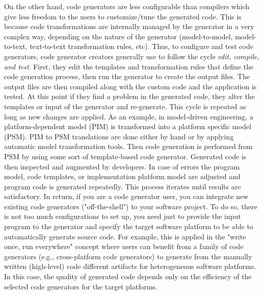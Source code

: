 On the other hand, code generators are less configurable than compilers which give less freedom to the users to customize/tune the generated code. This is because code transformations are internally managed by the generator in a very complex way, depending on the nature of the generator (model-to-model, model-to-text, text-to-text transformation rules, etc).
Thus, to configure and test code generators, code generator creators generally use to follow the cycle \textit{edit, compile, and test}. First, they edit the templates and transformation rules that define the code generation process, then run the generator to create the output files. The output files are then compiled along with the custom code and the application is tested. At this point if they find a problem in the generated code, they alter the templates or input of the generator and re-generate. This cycle is repeated as long as new changes are applied. 
As an example, in model-driven engineering, a platform-dependent model (PIM) is transformed into a platform specific model (PSM). PIM to PSM translations are done either by hand or by applying automatic model transformation tools. Then code generation is performed from PSM by using some sort of template-based code generator. Generated code is then inspected and augmented by developers. In case of errors the program model, code templates, or implementation platform model are adjusted and program code is generated repeatedly\cite{herrington2003code}. This process iterates until results are satisfactory.
In return, if you are a code generator user, you can integrate new existing code generators ("off-the-shell") to your software project. To do so, there is not too much configurations to set up, you need just to provide the input program to the generator and specify the target software platform to be able to automatically generate source code. 
For example, this is applied in the "write once, run everywhere" concept where users can benefit from a family of code generators (e.g., cross-platform code generators\cite{fumero2015runtime}) to generate from the manually written (high-level) code different artifacts for heterogeneous software platforms.
In this case, the quality of generated code depends only on the efficiency of the selected code generators for the target platforms.  

